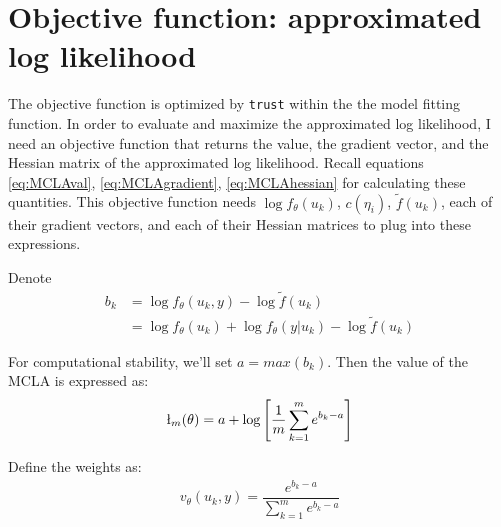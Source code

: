 \documentclass{article}
\begin{document}
\section{Objective function: approximated log likelihood}\label{sec:objfun}
The objective function is optimized by \texttt{trust} within the the model fitting function.  In order to evaluate and maximize the approximated log likelihood, I need an objective function that returns the value, the gradient vector, and the Hessian matrix of the approximated log likelihood.  Recall equations \ref{eq:MCLAval}, \ref{eq:MCLAgradient}, \ref{eq:MCLAhessian}   for calculating these quantities.  This objective function needs $\log f_\theta (u_k)$, $c(\eta_i)$, $\tilde{f}(u_k)$, each of their gradient vectors, and each of their Hessian matrices to plug into these expressions.    

Denote
\begin{align}
b_k &=  \log f_\theta (u_k,y)- \log \tilde{f} (u_k) \\
&= \log f_\theta (u_k) + \log f_\theta (y|u_k) - \log \tilde{f} (u_k) \label{eq:MCLA}
\end{align}


For computational stability, we'll set $a=max(b_k)$. Then the value of the MCLA is expressed as:\\
\begin{align}
\l_m (\theta) = a+ \log \left[ \dfrac{1}{m}  \sum_{k=1}^m e^{b_k-a} \right]
\end{align}

Define the weights as:
\begin{align}
v_\theta(u_k,y) = \dfrac{e^{b_k-a}}{ \sum_{k=1}^m e^{b_k-a}} 
\end{align}
\end{document}
